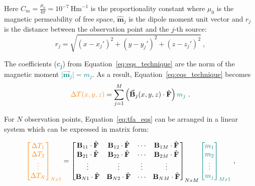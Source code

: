 \noindent
Here $C_m = \frac{\mu_0}{4 \pi} = 10^{-7} \ \text{Hm}^{-1}$ is the proportionality constant where $\mu_0$ is the magnetic permeability of free space, $\hat{\mathbf{m}}_j$ is the dipole moment unit vector and $r_j$ is the distance between the observation point and the $j$-th source:
\begin{equation}
    r_j = \sqrt{(x - x_j')^2 + (y - y_j')^2 + (z - z_j')^2}
    \ ,
\end{equation}
 

The coefficients (\textcolor{teal}{$\mathbf{c_j}$}) from Equation~\ref{eq:eqs_technique} are the norm of the magnetic moment \textcolor{teal}{$\vert \vec{\mathbf{m}}_j \vert = m_j$}. As a result, Equation~\ref{eq:eqs_technique} becomes
\begin{equation}
\label{eq:tfa_eqs}
\textcolor{orange}{\Delta T (x, y, z)} = \sum_{j=1}^{M} \left(\vec{\mathbf{B}}_j(x, y, z) \cdot \hat{\mathbf{F}}\right) \textcolor{teal}{m_j}
\ .
\end{equation}

For $N$ observation points, Equation~\ref{eq:tfa_eqs} can be arranged in a linear system which can be expressed in matrix form:

\begin{equation}
\textcolor{orange}{\begin{bmatrix}
    \Delta T_1 \\ \Delta T_2 \\ \vdots \\ \Delta T_N
\end{bmatrix}_{Nx1}} = \begin{bmatrix}
    \mathbf{B}_{11} \cdot \hat{\mathbf{F}} & \mathbf{B}_{12} \cdot \hat{\mathbf{F}} & \cdots & \mathbf{B}_{1M} \cdot \hat{\mathbf{F}} \\
    \mathbf{B}_{21} \cdot \hat{\mathbf{F}} & \mathbf{B}_{22} \cdot \hat{\mathbf{F}} & \cdots & \mathbf{B}_{2M} \cdot \hat{\mathbf{F}} \\
    \vdots & \vdots & \vdots & \vdots \\
    \mathbf{B}_{N1} \cdot \hat{\mathbf{F}} & \mathbf{B}_{N2} \cdot \hat{\mathbf{F}} & \cdots & \mathbf{B}_{NM} \cdot \hat{\mathbf{F}} \\
\end{bmatrix}_{NxM} \textcolor{teal}{\begin{bmatrix}
    m_1 \\ m_2 \\ \vdots \\ m_j
\end{bmatrix}_{Mx1}} \ ,
\end{equation}

